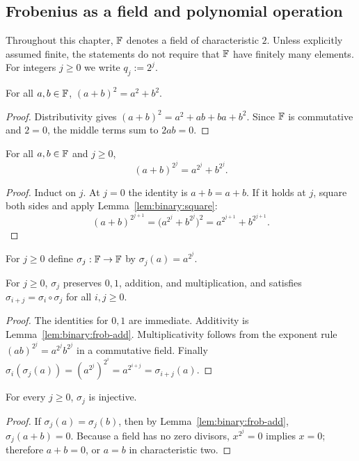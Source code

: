 \subsection{Frobenius as a field and polynomial operation}\label{sec:binary:frobenius}
Throughout this chapter, $\mathbb{F}$ denotes a field of characteristic $2$. Unless explicitly assumed finite, the statements do not require that $\mathbb{F}$ have finitely many elements. For integers $j\geq0$ we write $q_j:=2^j$.

\begin{lemma}\label{lem:binary:square}
For all $a,b\in\mathbb{F}$, $(a+b)^2=a^2+b^2$.
\end{lemma}
\begin{proof}
Distributivity gives $(a+b)^2=a^2+ab+ba+b^2$. Since $\mathbb{F}$ is commutative and $2=0$, the middle terms sum to $2ab=0$.
\end{proof}

\begin{lemma}\label{lem:binary:frob-add}
For all $a,b\in\mathbb{F}$ and $j\geq0$,
\[
 (a+b)^{2^j}=a^{2^j}+b^{2^j}.
\]
\end{lemma}
\begin{proof}
Induct on $j$. At $j=0$ the identity is $a+b=a+b$. If it holds at $j$, square both sides and apply Lemma~\ref{lem:binary:square}:
\[
 (a+b)^{2^{j+1}}
 =\bigl(a^{2^j}+b^{2^j}\bigr)^2
 =a^{2^{j+1}}+b^{2^{j+1}}.
\]
\end{proof}

\begin{definition}\label{def:binary:frob-scalar}
For $j\geq0$ define $\sigma_j:\mathbb{F}\to\mathbb{F}$ by $\sigma_j(a)=a^{2^j}$.
\end{definition}

\begin{lemma}\label{lem:binary:frob-ring}
For $j\geq0$, $\sigma_j$ preserves $0,1$, addition, and multiplication, and satisfies
$\sigma_{i+j}=\sigma_i\circ\sigma_j$ for all $i,j\geq0$.
\end{lemma}
\begin{proof}
The identities for $0,1$ are immediate. Additivity is Lemma~\ref{lem:binary:frob-add}. Multiplicativity follows from the exponent rule $(ab)^{2^j}=a^{2^j}b^{2^j}$ in a commutative field. Finally
$\sigma_i(\sigma_j(a))=(a^{2^j})^{2^i}=a^{2^{i+j}}=\sigma_{i+j}(a)$.
\end{proof}

\begin{lemma}\label{lem:binary:frob-injective}
For every $j\geq0$, $\sigma_j$ is injective.
\end{lemma}
\begin{proof}
If $\sigma_j(a)=\sigma_j(b)$, then by Lemma~\ref{lem:binary:frob-add},
$\sigma_j(a+b)=0$. Because a field has no zero divisors, $x^{2^j}=0$ implies $x=0$; therefore $a+b=0$, or $a=b$ in characteristic two.
\end{proof}

